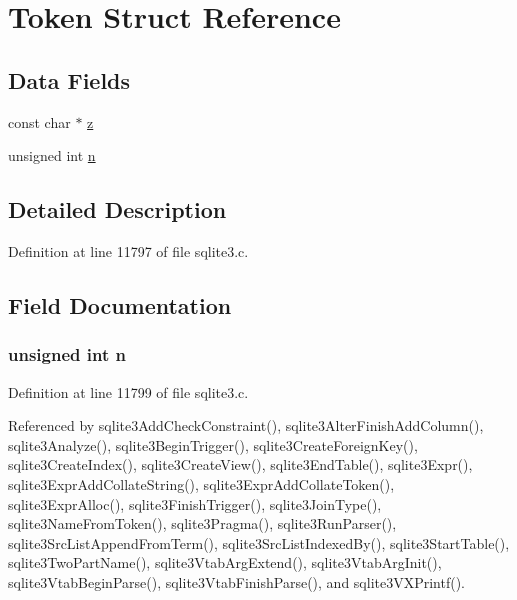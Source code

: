 \hypertarget{struct_token}{}\section{Token Struct Reference}
\label{struct_token}
\subsection*{Data Fields}
\begin{DoxyCompactItemize}
\item 
const char $\ast$ \hyperlink{struct_token_aaa6cadadf922a338c70151eeed2b09ec}{z}
\item 
unsigned int \hyperlink{struct_token_a7d46b74409bd32b539089ef4721ea544}{n}
\end{DoxyCompactItemize}


\subsection{Detailed Description}


Definition at line 11797 of file sqlite3.\+c.



\subsection{Field Documentation}
\hypertarget{struct_token_a7d46b74409bd32b539089ef4721ea544}{}
\subsubsection[{n}]{\setlength{\rightskip}{0pt plus 5cm}unsigned int n}\label{struct_token_a7d46b74409bd32b539089ef4721ea544}


Definition at line 11799 of file sqlite3.\+c.



Referenced by sqlite3\+Add\+Check\+Constraint(), sqlite3\+Alter\+Finish\+Add\+Column(), sqlite3\+Analyze(), sqlite3\+Begin\+Trigger(), sqlite3\+Create\+Foreign\+Key(), sqlite3\+Create\+Index(), sqlite3\+Create\+View(), sqlite3\+End\+Table(), sqlite3\+Expr(), sqlite3\+Expr\+Add\+Collate\+String(), sqlite3\+Expr\+Add\+Collate\+Token(), sqlite3\+Expr\+Alloc(), sqlite3\+Finish\+Trigger(), sqlite3\+Join\+Type(), sqlite3\+Name\+From\+Token(), sqlite3\+Pragma(), sqlite3\+Run\+Parser(), sqlite3\+Src\+List\+Append\+From\+Term(), sqlite3\+Src\+List\+Indexed\+By(), sqlite3\+Start\+Table(), sqlite3\+Two\+Part\+Name(), sqlite3\+Vtab\+Arg\+Extend(), sqlite3\+Vtab\+Arg\+Init(), sqlite3\+Vtab\+Begin\+Parse(), sqlite3\+Vtab\+Finish\+Parse(), and sqlite3\+V\+X\+Printf().


